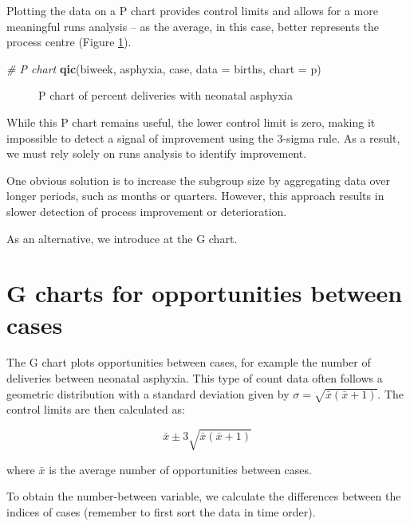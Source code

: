 \documentclass[
]{book}
\makeatletter
\newenvironment{Shaded}{\begin{snugshade}}{\end{snugshade}}
\newcommand{\AttributeTok}[1]{\textcolor[rgb]{0.13,0.29,0.53}{#1}}
\newcommand{\CommentTok}[1]{\textcolor[rgb]{0.56,0.35,0.01}{\textit{#1}}}
\newcommand{\FunctionTok}[1]{\textcolor[rgb]{0.13,0.29,0.53}{\textbf{#1}}}
\newcommand{\NormalTok}[1]{#1}
\newcommand{\StringTok}[1]{\textcolor[rgb]{0.31,0.60,0.02}{#1}}
\newcommand*\pandocbounded[1]{%
  \sbox\pandoc@box{#1}%
  \Gscale@div\@tempa{\textheight}{\dimexpr\ht\pandoc@box+\dp\pandoc@box\relax}%
  \Gscale@div\@tempb{\linewidth}{\wd\pandoc@box}%
  \ifdim\@tempb\p@<\@tempa\p@\let\@tempa\@tempb\fi%
  \ifdim\@tempa\p@<\p@\scalebox{\@tempa}{\usebox\pandoc@box}%
  \else\usebox{\pandoc@box}%
  \fi%
}
\makeatother
\begin{document}
Plotting the data on a P chart provides control limits and allows for a more meaningful runs analysis -- as the average, in this case, better represents the process centre (Figure \ref{fig:rare-fig3}).

\begin{Shaded}
\begin{Highlighting}[]
\CommentTok{\# P chart}
\FunctionTok{qic}\NormalTok{(biweek, asphyxia, case, }
    \AttributeTok{data  =}\NormalTok{ births, }
    \AttributeTok{chart =} \StringTok{\textquotesingle{}p\textquotesingle{}}\NormalTok{)}
\end{Highlighting}
\end{Shaded}

\begin{figure}
\centering
\pandocbounded{}
\caption{\label{fig:rare-fig3}P chart of percent deliveries with neonatal asphyxia}
\end{figure}

While this P chart remains useful, the lower control limit is zero, making it impossible to detect a signal of improvement using the 3-sigma rule. As a result, we must rely solely on runs analysis to identify improvement.

One obvious solution is to increase the subgroup size by aggregating data over longer periods, such as months or quarters. However, this approach results in slower detection of process improvement or deterioration.

As an alternative, we introduce at the G chart.

\section{G charts for opportunities between cases}\label{g-charts-for-opportunities-between-cases}

The G chart plots opportunities between cases, for example the number of deliveries between neonatal asphyxia. This type of count data often follows a geometric distribution with a standard deviation given by \(\sigma = \sqrt{\bar{x}(\bar{x}+1)}\). The control limits are then calculated as:

\[\bar{x}\pm3\sqrt{\bar{x}(\bar{x}+1)}\]

where \(\bar{x}\) is the average number of opportunities between cases.

To obtain the number-between variable, we calculate the differences between the indices of cases (remember to first sort the data in time order).
\end{document}
